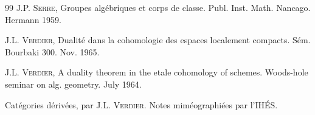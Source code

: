 \begin{thebibliography}{99}
 J.P. \textsc{Serre}, Groupes algébriques et corps de
classe. Publ. Inst. Math. Nancago. Hermann 1959.

 J.L. \textsc{Verdier}, Dualité dans la cohomologie des espaces
localement compacts. Sém. Bourbaki 300. Nov. 1965.

 J.L. \textsc{Verdier}, A duality theorem in the etale
  cohomology of schemes. Woods-hole seminar on alg. geometry. July 1964.

 Catégories dérivées, par J.L. \textsc{Verdier}. Notes
miméographiées par l'IHÉS.

\end{thebibliography}



\ifx\danslelivre\undefined

\fi
